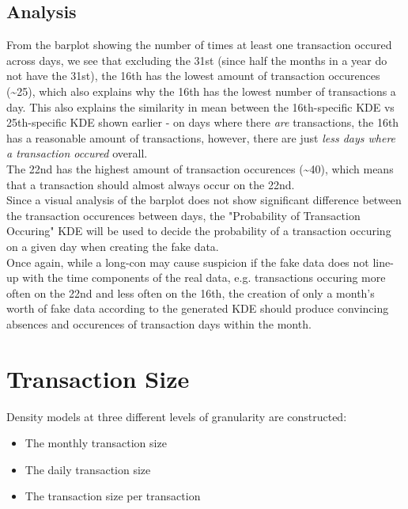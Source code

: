 \documentclass[11pt]{article}
\providecommand{\tightlist}{%
      \setlength{\itemsep}{0pt}\setlength{\parskip}{0pt}}
\begin{document}
    \subsection{Analysis}

From the barplot showing the number of times at least one transaction
occured across days, we see that excluding the 31st (since half the
months in a year do not have the 31st), the 16th has the lowest amount
of transaction occurences (\textasciitilde{}25), which also explains why
the 16th has the lowest number of transactions a day. This also explains
the similarity in mean between the 16th-specific KDE vs 25th-specific
KDE shown earlier - on days where there \emph{are} transactions, the
16th has a reasonable amount of transactions, however, there are just
\emph{less days where a transaction occured} overall.\\

The 22nd has the highest amount of transaction occurences
(\textasciitilde{}40), which means that a transaction should almost
always occur on the 22nd.\\

Since a visual analysis of the barplot does not show significant
difference between the transaction occurences between days, the
"Probability of Transaction Occuring" KDE will be used to decide the
probability of a transaction occuring on a given day when creating the
fake data.\\

Once again, while a long-con may cause suspicion if the fake data does
not line-up with the time components of the real data, e.g. transactions
occuring more often on the 22nd and less often on the 16th, the creation
of only a month's worth of fake data according to the generated KDE
should produce convincing absences and occurences of transaction days
within the month.
\newpage
    \section{Transaction Size}

Density models at three different levels of granularity are constructed:

\begin{itemize}
\tightlist
\item
  The monthly transaction size
\item
  The daily transaction size
\item
  The transaction size per transaction
\end{itemize}
\end{document}
